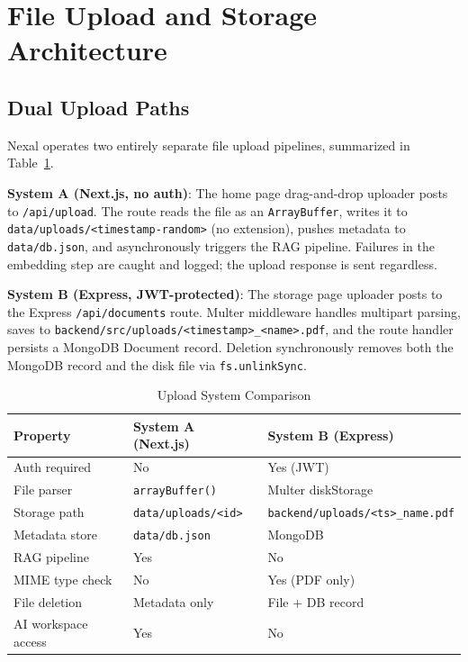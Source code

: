 \documentclass[conference]{IEEEtran}
\begin{document}
\section{File Upload and Storage Architecture}
\label{sec:storage}

\subsection{Dual Upload Paths}

Nexal operates two entirely separate file upload pipelines, summarized in Table~\ref{tab:upload_paths}.

\textbf{System A (Next.js, no auth)}: The home page drag-and-drop uploader posts to \texttt{/api/upload}. The route reads the file as an \texttt{ArrayBuffer}, writes it to \texttt{data/uploads/<timestamp-random>} (no extension), pushes metadata to \texttt{data/db.json}, and asynchronously triggers the RAG pipeline. Failures in the embedding step are caught and logged; the upload response is sent regardless.

\textbf{System B (Express, JWT-protected)}: The storage page uploader posts to the Express \texttt{/api/documents} route. Multer middleware handles multipart parsing, saves to \texttt{backend/src/uploads/<timestamp>\_<name>.pdf}, and the route handler persists a MongoDB Document record. Deletion synchronously removes both the MongoDB record and the disk file via \texttt{fs.unlinkSync}.

\begin{table}[H]
\centering
\caption{Upload System Comparison}
\label{tab:upload_paths}
\renewcommand{\arraystretch}{1.2}
\begin{tabularx}{\linewidth}{@{}lXX@{}}
\toprule
\textbf{Property} & \textbf{System A (Next.js)} & \textbf{System B (Express)} \\
\midrule
Auth required & No & Yes (JWT) \\
File parser & \texttt{arrayBuffer()} & Multer diskStorage \\
Storage path & \texttt{data/uploads/<id>} & \texttt{backend/uploads/<ts>\_name.pdf} \\
Metadata store & \texttt{data/db.json} & MongoDB \\
RAG pipeline & Yes & No \\
MIME type check & No & Yes (PDF only) \\
File deletion & Metadata only & File + DB record \\
AI workspace access & Yes & No \\
\bottomrule
\end{tabularx}
\end{table}
\end{document}

